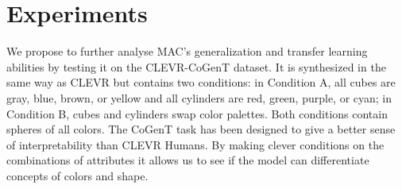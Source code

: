 \section{Experiments}

We propose to further analyse MAC’s generalization and transfer learning abilities by testing it on the CLEVR-CoGenT dataset. It is synthesized in the same way as CLEVR but contains two conditions: in Condition A, all cubes are gray, blue, brown, or yellow and all cylinders are red, green, purple, or cyan; in Condition B, cubes and cylinders swap color palettes. Both conditions contain spheres of all colors. The CoGenT task has been designed to give a better sense of interpretability than CLEVR Humans. By making clever conditions on the combinations of attributes it allows us to see  if the model can differentiate concepts of colors and shape.